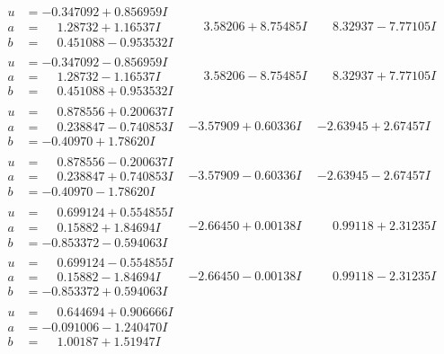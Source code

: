 \documentclass[1p]{elsarticle_modified}
\theoremstyle{definition}
\begin{document}
$$\begin{array}{c|c|c}
\begin{aligned}
u &= -0.347092 + 0.856959 I \\
a &= \phantom{-}1.28732 + 1.16537 I \\
b &= \phantom{-}0.451088 - 0.953532 I\end{aligned}
 & \phantom{-}3.58206 + 8.75485 I & \phantom{-}8.32937 - 7.77105 I \\ \hline\begin{aligned}
u &= -0.347092 - 0.856959 I \\
a &= \phantom{-}1.28732 - 1.16537 I \\
b &= \phantom{-}0.451088 + 0.953532 I\end{aligned}
 & \phantom{-}3.58206 - 8.75485 I & \phantom{-}8.32937 + 7.77105 I \\ \hline\begin{aligned}
u &= \phantom{-}0.878556 + 0.200637 I \\
a &= \phantom{-}0.238847 - 0.740853 I \\
b &= -0.40970 + 1.78620 I\end{aligned}
 & -3.57909 + 0.60336 I & -2.63945 + 2.67457 I \\ \hline\begin{aligned}
u &= \phantom{-}0.878556 - 0.200637 I \\
a &= \phantom{-}0.238847 + 0.740853 I \\
b &= -0.40970 - 1.78620 I\end{aligned}
 & -3.57909 - 0.60336 I & -2.63945 - 2.67457 I \\ \hline\begin{aligned}
u &= \phantom{-}0.699124 + 0.554855 I \\
a &= \phantom{-}0.15882 + 1.84694 I \\
b &= -0.853372 - 0.594063 I\end{aligned}
 & -2.66450 + 0.00138 I & \phantom{-}0.99118 + 2.31235 I \\ \hline\begin{aligned}
u &= \phantom{-}0.699124 - 0.554855 I \\
a &= \phantom{-}0.15882 - 1.84694 I \\
b &= -0.853372 + 0.594063 I\end{aligned}
 & -2.66450 - 0.00138 I & \phantom{-}0.99118 - 2.31235 I \\ \hline\begin{aligned}
u &= \phantom{-}0.644694 + 0.906666 I \\
a &= -0.091006 - 1.240470 I \\
b &= \phantom{-}1.00187 + 1.51947 I\end{aligned}

\end{array}$$
\end{document}

